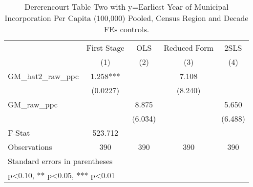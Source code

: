 \begin{table}[htbp]\centering
\def\sym#1{\ifmmode^{#1}\else\(^{#1}\)\fi}
\caption{Dererencourt Table Two with y=Earliest Year of Municipal Incorporation Per Capita (100,000) Pooled, Census Region and Decade FEs controls.}
\begin{tabular}{l*{4}{c}}
\toprule
                    & First Stage   &         OLS   &Reduced Form   &        2SLS   \\
                    &\multicolumn{1}{c}{(1)}   &\multicolumn{1}{c}{(2)}   &\multicolumn{1}{c}{(3)}   &\multicolumn{1}{c}{(4)}   \\
\midrule
GM\_hat2\_raw\_ppc     &       1.258***&               &       7.108   &               \\
                    &    (0.0227)   &               &     (8.240)   &               \\
\addlinespace
GM\_raw\_ppc          &               &       8.875   &               &       5.650   \\
                    &               &     (6.034)   &               &     (6.488)   \\
\midrule
F-Stat              &     523.712   &               &               &               \\
Observations        &         390   &         390   &         390   &         390   \\
\bottomrule
\multicolumn{5}{l}{\footnotesize Standard errors in parentheses}\\
\multicolumn{5}{l}{\footnotesize * p<0.10, ** p<0.05, *** p<0.01}\\
\end{tabular}
\end{table}
